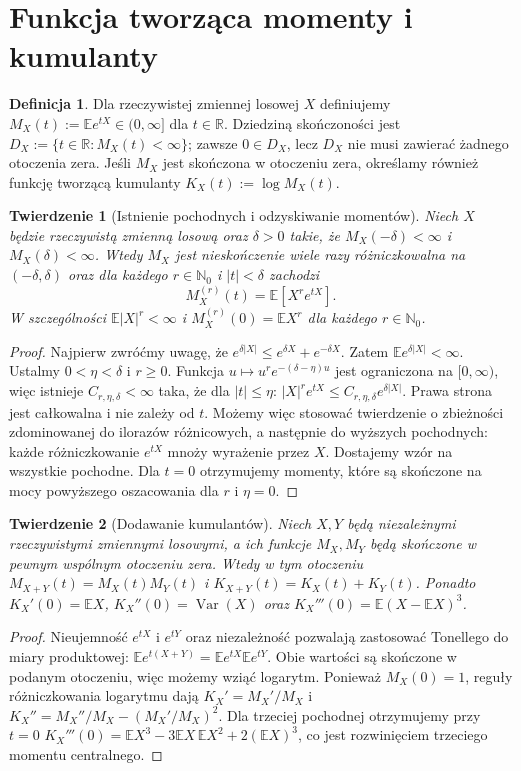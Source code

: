\documentclass[11pt,a4paper,oneside]{report}
\numberwithin{equation}{chapter}
\theoremstyle{plain}
\newtheorem{twierdzenie}{Twierdzenie}[chapter]
\theoremstyle{definition}
\newtheorem{definicja}{Definicja}[chapter]
\theoremstyle{remark}
\newcommand{\R}{\mathbb{R}}
\newcommand{\N}{\mathbb{N}}
\newcommand{\E}{\mathbb{E}}
\newcommand{\Var}{\operatorname{Var}}
\begin{document}
\section{Funkcja tworząca momenty i kumulanty}

\begin{definicja}
Dla rzeczywistej zmiennej losowej $X$ definiujemy
$M_X(t):=\E e^{tX}\in(0,\infty]$ dla $t\in\R$.
Dziedziną skończoności jest $D_X:=\{t\in\R:M_X(t)<\infty\}$;
zawsze $0\in D_X$, lecz $D_X$ nie musi zawierać
żadnego otoczenia zera. Jeśli $M_X$ jest skończona
w otoczeniu zera, określamy również funkcję tworzącą
kumulanty $K_X(t):=\log M_X(t)$.
\end{definicja}

\begin{twierdzenie}[Istnienie pochodnych i odzyskiwanie momentów]
Niech $X$ będzie rzeczywistą zmienną losową oraz
$\delta>0$ takie, że $M_X(-\delta)<\infty$ i
$M_X(\delta)<\infty$. Wtedy $M_X$ jest nieskończenie
wiele razy różniczkowalna na $(-\delta,\delta)$ oraz
dla każdego $r\in\N_0$ i $|t|<\delta$ zachodzi
\[
M_X^{(r)}(t)=\E[X^r e^{tX}].
\]
W szczególności $\E|X|^r<\infty$ i
$M_X^{(r)}(0)=\E X^r$ dla każdego $r\in\N_0$.
\end{twierdzenie}
\begin{proof}
Najpierw zwróćmy uwagę, że
$e^{\delta|X|}\leq e^{\delta X}+e^{-\delta X}$.
Zatem $\E e^{\delta|X|}<\infty$.
Ustalmy $0<\eta<\delta$ i $r\geq0$. Funkcja
$u\mapsto u^re^{-(\delta-\eta)u}$ jest ograniczona na
$[0,\infty)$, więc istnieje $C_{r,\eta,\delta}<\infty$
taka, że dla $|t|\leq\eta$:
$|X|^re^{tX}\leq C_{r,\eta,\delta}e^{\delta|X|}$.
Prawa strona jest całkowalna i nie zależy od $t$.
Możemy więc stosować twierdzenie o zbieżności zdominowanej
do ilorazów różnicowych, a następnie do wyższych pochodnych:
każde różniczkowanie $e^{tX}$ mnoży wyrażenie przez $X$.
Dostajemy wzór na wszystkie pochodne. Dla $t=0$
otrzymujemy momenty, które są skończone na mocy
powyższego oszacowania dla $r$ i $\eta=0$.
\end{proof}

\begin{twierdzenie}[Dodawanie kumulantów]
Niech $X,Y$ będą niezależnymi rzeczywistymi zmiennymi losowymi,
a ich funkcje $M_X,M_Y$ będą skończone w pewnym wspólnym
otoczeniu zera. Wtedy w tym otoczeniu
$M_{X+Y}(t)=M_X(t)M_Y(t)$ i
$K_{X+Y}(t)=K_X(t)+K_Y(t)$.
Ponadto $K_X'(0)=\E X$, $K_X''(0)=\Var(X)$
oraz $K_X'''(0)=\E(X-\E X)^3$.
\end{twierdzenie}
\begin{proof}
Nieujemność $e^{tX}$ i $e^{tY}$ oraz niezależność pozwalają
zastosować Tonellego do miary produktowej:
$\E e^{t(X+Y)}=\E e^{tX}\E e^{tY}$.
Obie wartości są skończone w podanym otoczeniu, więc
możemy wziąć logarytm. Ponieważ $M_X(0)=1$, reguły
różniczkowania logarytmu dają
$K_X'=M_X'/M_X$ i
$K_X''=M_X''/M_X-(M_X'/M_X)^2$.
Dla trzeciej pochodnej otrzymujemy przy $t=0$
$K_X'''(0)=\E X^3-3\E X\,\E X^2+2(\E X)^3$,
co jest rozwinięciem trzeciego momentu centralnego.
\end{proof}
\end{document}
